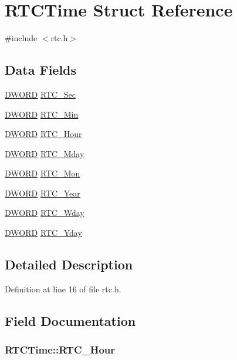 \hypertarget{structRTCTime}{
\section{RTCTime Struct Reference}
\label{structRTCTime}
}


{\ttfamily \#include $<$rtc.h$>$}

\subsection*{Data Fields}
\begin{DoxyCompactItemize}
\item 
\hyperlink{rtc_8h_a95e001ec9ba8a0755d5a5b087a733d4e}{DWORD} \hyperlink{structRTCTime_ab14ec114407f3361087624eea5d43c19}{RTC\_\-Sec}
\item 
\hyperlink{rtc_8h_a95e001ec9ba8a0755d5a5b087a733d4e}{DWORD} \hyperlink{structRTCTime_aa9c8cd2d54685a9c6aa7093d0e6cd1dd}{RTC\_\-Min}
\item 
\hyperlink{rtc_8h_a95e001ec9ba8a0755d5a5b087a733d4e}{DWORD} \hyperlink{structRTCTime_a99de59f01d8936a698dd41ed8d45121b}{RTC\_\-Hour}
\item 
\hyperlink{rtc_8h_a95e001ec9ba8a0755d5a5b087a733d4e}{DWORD} \hyperlink{structRTCTime_a5077e93b31e29a15d1f0d8191b9e9ea9}{RTC\_\-Mday}
\item 
\hyperlink{rtc_8h_a95e001ec9ba8a0755d5a5b087a733d4e}{DWORD} \hyperlink{structRTCTime_ac01f07a46c73b86011342b90b8c1100a}{RTC\_\-Mon}
\item 
\hyperlink{rtc_8h_a95e001ec9ba8a0755d5a5b087a733d4e}{DWORD} \hyperlink{structRTCTime_aefae78d754a8ef926f4d646e2b7f4bda}{RTC\_\-Year}
\item 
\hyperlink{rtc_8h_a95e001ec9ba8a0755d5a5b087a733d4e}{DWORD} \hyperlink{structRTCTime_a4f063d5cc84028b06d4cdac73e0d74c9}{RTC\_\-Wday}
\item 
\hyperlink{rtc_8h_a95e001ec9ba8a0755d5a5b087a733d4e}{DWORD} \hyperlink{structRTCTime_aad91737813b216f18c7268b74b33d91a}{RTC\_\-Yday}
\end{DoxyCompactItemize}


\subsection{Detailed Description}


Definition at line 16 of file rtc.h.



\subsection{Field Documentation}
\hypertarget{structRTCTime_a99de59f01d8936a698dd41ed8d45121b}{
\subsubsection[{RTC\_\-Hour}]{ {\bf RTCTime::RTC\_\-Hour}}}
\label{structRTCTime_a99de59f01d8936a698dd41ed8d45121b}


